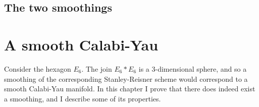 \documentclass[11pt, english]{book}
\begin{document}

\section{The two smoothings}


\chapter{A smooth Calabi-Yau}

Consider the hexagon $E_6$. The join $E_6 \ast E_6$ is a $3$-dimensional sphere, and so a smoothing of the corresponding Stanley-Reisner scheme would correspond to a smooth Calabi-Yau manifold. In this chapter I prove that there does indeed exist a smoothing, and I describe some of its properties.






\end{document}
